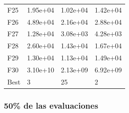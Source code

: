 \begin{table}[H]
\begin{minipage}{.5\linewidth}
\begin{tabular}{llll}
        F25  &   1.95e+04 &   1.02e+04 &  1.42e+04 \\
        F26  &   4.89e+04 &   2.16e+04 &  2.88e+04 \\
        F27  &   1.28e+04 &   3.08e+03 &  4.28e+03 \\
        F28  &   2.60e+04 &   1.43e+04 &  1.67e+04 \\
        F29  &   1.30e+04 &   1.13e+04 &  1.49e+04 \\
        F30  &   3.10e+10 &   2.13e+09 &  6.92e+09 \\
        Best &          3 &         25 &         2 \\
        \bottomrule
        \end{tabular}
        
    \end{minipage} 
\end{table}


\subsubsection*{50\% de las evaluaciones}

